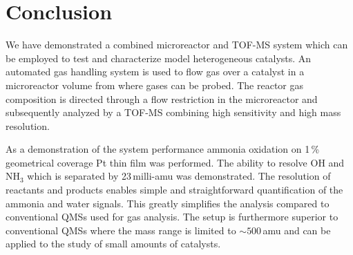 \documentclass[aip,rsi]{revtex4-1}
\begin{document}
\section{Conclusion}
We have demonstrated a combined microreactor and TOF-MS system which can be employed to test and characterize model heterogeneous catalysts. An automated gas handling system is used to flow gas over a catalyst in a microreactor volume from where gases can be probed. The reactor gas composition is directed through a flow restriction in the microreactor and subsequently analyzed by a TOF-MS combining high sensitivity and high mass resolution.

As a demonstration of the system performance ammonia oxidation on 1\,\% geometrical coverage Pt thin film was performed. The ability to resolve OH and NH$_3$ which is separated by 23\,milli-amu was demonstrated. The resolution of reactants and products enables simple and straightforward quantification of the ammonia and water signals. This greatly simplifies the analysis compared to conventional QMSs used for gas analysis. The setup is furthermore superior to conventional QMSs where the mass range is limited to $\sim500$\,amu and can be applied to the study of small amounts of catalysts.



%
%

%
\end{document}

